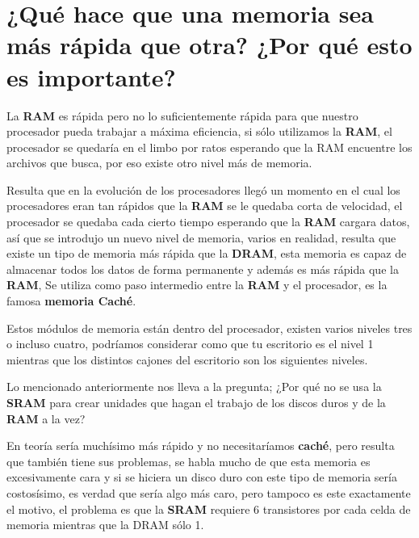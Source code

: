 \documentclass{article}
\begin{document}
\section{¿Qué hace que una memoria sea más rápida que otra? ¿Por qué esto es importante?}

La \textbf{RAM} es rápida pero no lo suficientemente rápida para que nuestro procesador pueda trabajar a máxima eficiencia, si sólo utilizamos la \textbf{RAM}, el procesador se quedaría en el limbo por ratos esperando que la RAM encuentre los archivos que busca, por eso existe otro nivel más de memoria. 

\vspace{0.5cm}

Resulta que en la evolución de los procesadores llegó un momento en el cual los procesadores eran tan rápidos que la \textbf{RAM} se le quedaba corta de velocidad, el procesador se quedaba cada cierto tiempo esperando que la \textbf{RAM} cargara datos, así que se introdujo un nuevo nivel de memoria, varios en realidad, resulta que existe un tipo de memoria más rápida que la \textbf{DRAM}, esta memoria es capaz de almacenar todos los datos de forma permanente y además es más rápida que la \textbf{RAM}, Se utiliza como paso intermedio entre la \textbf{RAM} y el procesador, es la famosa \textbf{memoria Caché}.

\vspace{0.5cm}

Estos módulos de memoria están dentro del procesador, existen varios niveles tres o incluso cuatro, podríamos considerar como que tu escritorio es el nivel 1 mientras que los distintos cajones del escritorio son los siguientes niveles.

\vspace{0.5cm}

Lo mencionado anteriormente nos lleva a la pregunta; ¿Por qué no se usa la \textbf{SRAM} para crear unidades que hagan el trabajo de los discos duros y de la \textbf{RAM} a la vez? 

\vspace{0.5cm}

En teoría sería muchísimo más rápido y no necesitaríamos \textbf{caché}, pero resulta que también tiene sus problemas, se habla mucho de que esta memoria es excesivamente cara y si se hiciera un disco duro con este tipo de memoria sería costosísimo, es verdad que sería algo más caro, pero tampoco es este exactamente el motivo, el problema es que la \textbf{SRAM} requiere 6 transistores por cada celda de memoria mientras que la DRAM sólo 1. 
\end{document}
